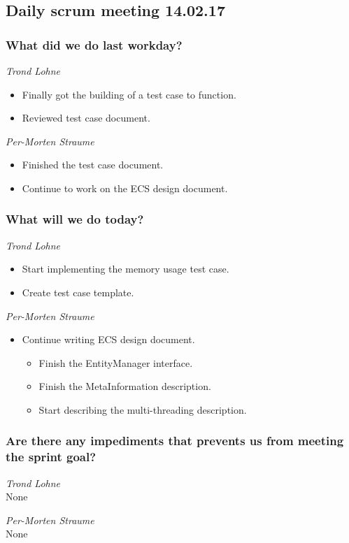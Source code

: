 \documentclass{article}
\begin{document}
\begin{center}
\subsection*{Daily scrum meeting 14.02.17}
\end{center}
\bigskip


\subsubsection*{What did we do last workday?}

\noindent\textit{Trond Lohne}
\begin{itemize}
	\item 
	Finally got the building of a test case to function.
	
	\item 
	Reviewed test case document.
\end{itemize}

\medskip

\noindent\textit{Per-Morten Straume}
\begin{itemize}
	\item 
	Finished the test case document.
	
	\item 
	Continue to work on the ECS design document.
\end{itemize}


\subsubsection*{What will we do today?}

\noindent\textit{Trond Lohne}
\begin{itemize}
	\item 
	Start implementing the memory usage test case.
	
	\item 
	Create test case template.
\end{itemize}

\medskip

\noindent\textit{Per-Morten Straume}
\begin{itemize}
	\item 
	Continue writing ECS design document.
        \begin{itemize}
            \item
            Finish the EntityManager interface.

            \item
            Finish the MetaInformation description.

            \item
            Start describing the multi-threading description.
        \end{itemize}
\end{itemize}


\subsubsection*{Are there any impediments that prevents us from meeting the sprint goal?}

\noindent\textit{Trond Lohne}\\
None

\medskip

\noindent\textit{Per-Morten Straume}\\
None
\end{document}
